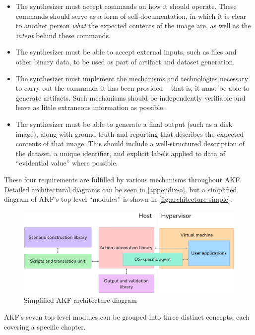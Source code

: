 \documentclass[letterpaper,12pt]{report}
\def\tightlist{}
\begin{document}
\begin{itemize}
\tightlist
\item
  The synthesizer must accept commands on how it should operate. These
  commands should serve as a form of self-documentation, in which it is
  clear to another person \emph{what} the expected contents of the image
  are, as well as the \emph{intent} behind these commands.
\item
  The synthesizer must be able to accept external inputs, such as files
  and other binary data, to be used as part of artifact and dataset
  generation.
\item
  The synthesizer must implement the mechanisms and technologies
  necessary to carry out the commands it has been provided -- that is,
  it must be able to generate artifacts. Such mechanisms should be
  independently verifiable and leave as little extraneous information as
  possible.
\item
  The synthesizer must be able to generate a final output (such as a
  disk image), along with ground truth and reporting that describes the
  expected contents of that image. This should include a well-structured
  description of the dataset, a unique identifier, and explicit labels
  applied to data of ``evidential value'' where possible.
\end{itemize}

These four requirements are fulfilled by various mechanisms throughout
AKF. Detailed architectural diagrams can be seen in \autoref{appendix-a}, but a simplified diagram of AKF's top-level
``modules'' is shown in \autoref{fig:architecture-simple}.

\begin{figure}[htbp]
\centering
\includegraphics[width=1\linewidth]{architecture-simple.png}
\caption{Simplified AKF architecture
diagram}\label{fig:architecture-simple}
\end{figure}

AKF's seven top-level modules can be grouped into three distinct
concepts, each covering a specific chapter.
\end{document}
